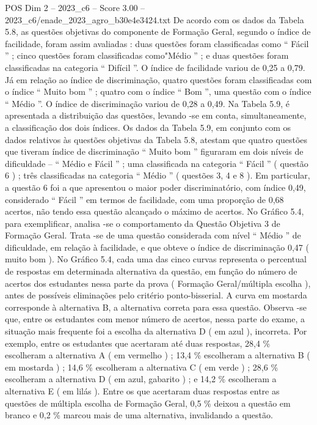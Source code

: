 \begin{textsample}{POS Dim 2 – 2023\_c6 – Score 3.00 – 2023\_c6/enade\_2023\_agro\_b30e4e3424.txt}
De acordo com os dados da Tabela 5.8, as questões objetivas do componente de Formação Geral, segundo o índice de facilidade, foram assim avaliadas : duas questões foram classificadas como “ Fácil ” ; cinco questões foram classificadas como"Médio ” ; e duas questões foram classificadas na categoria “ Difícil ”.
O índice de facilidade variou de 0,25 a 0,79.
Já em relação ao índice de discriminação, quatro questões foram classificadas com o índice “ Muito bom ” ; quatro com o índice “ Bom ”, uma questão com o índice “ Médio ”.
O índice de discriminação variou de 0,28 a 0,49.
Na Tabela 5.9, é apresentada a distribuição das questões, levando -se em conta, simultaneamente, a classificação dos dois índices.
Os dados da Tabela 5.9, em conjunto com os dados relativos às questões objetivas da Tabela 5.8, atestam que quatro questões que tiveram índice de discriminação “ Muito bom ” figuraram em dois níveis de dificuldade – “ Médio e Fácil ” ; uma classificada na categoria “ Fácil ” ( questão 6 ) ; três classificadas na categoria “ Médio ” ( questões 3, 4 e 8 ).
Em particular, a questão 6 foi a que apresentou o maior poder discriminatório, com índice 0,49, considerado “ Fácil ” em termos de facilidade, com uma proporção de 0,68 acertos, não tendo essa questão alcançado o máximo de acertos.
No Gráfico 5.4, para exemplificar, analisa -se o comportamento da Questão Objetiva 3 de Formação Geral.
Trata -se de uma questão considerada com nível “ Médio ” de dificuldade, em relação à facilidade, e que obteve o índice de discriminação 0,47 ( muito bom ).
No Gráfico 5.4, cada uma das cinco curvas representa o percentual de respostas em determinada alternativa da questão, em função do número de acertos dos estudantes nessa parte da prova ( Formação Geral/múltipla escolha ), antes de possíveis eliminações pelo critério ponto-bisserial.
A curva em mostarda corresponde à alternativa B, a alternativa correta para essa questão.
Observa -se que, entre os estudantes com menor número de acertos, nessa parte do exame, a situação mais frequente foi a escolha da alternativa D ( em azul ), incorreta.
Por exemplo, entre os estudantes que acertaram até duas respostas, 28,4 \% escolheram a alternativa A ( em vermelho ) ; 13,4 \% escolheram a alternativa B ( em mostarda ) ; 14,6 \% escolheram a alternativa C ( em verde ) ; 28,6 \% escolheram a alternativa D ( em azul, gabarito ) ; e 14,2 \% escolheram a alternativa E ( em lilás ).
Entre os que acertaram duas respostas entre as questões de múltipla escolha de Formação Geral, 0,5 \% deixou a questão em branco e 0,2 \% marcou mais de uma alternativa, invalidando a questão.

\end{textsample}
